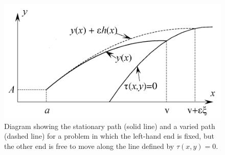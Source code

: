 \newcommand{\w}{v + \epsilon \xi + \mathcal{O}\lr{\epsilon^2}}
\newcommand{\z}{\epsilon \xi + \mathcal{O}\lr{\epsilon^2}}%
\renewcommand{\ve}{v_\epsilon}%
\graphicspath{ {./images/}}
\begin{figure}[h]
\centering
\includegraphics[width=\textwidth]{figure10_6.png}
\caption{Diagram showing the stationary path (solid line) and a varied path (dashed line) for a problem in which the left-hand end is fixed, but the other end is free to move along the line defined by $\tau(x, y) = 0$.}
\label{fig:mesh1}
\end{figure}

